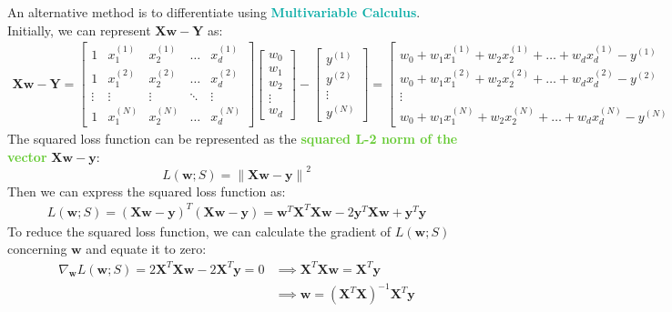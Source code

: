 \documentclass[twoside]{article}
\newcommand{\highlightbluetext}[1]{\textcolor[HTML]{09ACA6}{\textbf{#1}}}
\newcommand{\highlightgreentext}[1]{\textcolor[HTML]{62C92F}{\textbf{#1}}}
\numberwithin{equation}{section}
\begin{document}
	\newpage
	An alternative method is to differentiate using \highlightbluetext{Multivariable Calculus}. Initially, we can represent $\mathbf{Xw} - \mathbf{Y}$ as:
	\begin{align*}
		\mathbf{Xw} - \mathbf{Y} = \begin{bmatrix}
			1 & x_1^{(1)} & x_2^{(1)} & \ldots & x_d^{(1)} \\
			1 & x_1^{(2)} & x_2^{(2)} & \ldots & x_d^{(2)} \\
			\vdots & \vdots & \vdots & \ddots & \vdots \\
			1 & x_1^{(N)} & x_2^{(N)} & \ldots & x_d^{(N)} 
		\end{bmatrix} \begin{bmatrix} w_0 \\ w_1 \\ w_2 \\ \vdots \\ w_d \end{bmatrix} - \begin{bmatrix}
			y^{(1)} \\ y^{(2)} \\ \vdots \\ y^{(N)}
		\end{bmatrix} = \begin{bmatrix}
			w_0 + w_1 x_1^{(1)} + w_2 x_2^{(1)} + \ldots + w_d x_d^{(1)} - y^{(1)} \\
			w_0 + w_1 x_1^{(2)} + w_2 x_2^{(2)} + \ldots + w_d x_d^{(2)} - y^{(2)} \\
			\vdots \\
			w_0 + w_1 x_1^{(N)} + w_2 x_2^{(N)} + \ldots + w_d x_d^{(N)} - y^{(N)}
		\end{bmatrix}
	\end{align*}
	The squared loss function can be represented as the \highlightgreentext{squared L-2 norm of the vector} $\mathbf{Xw} - \mathbf{y}$:
	\begin{equation}
	\label{eq:MultiOutputRegressionSquaredLossFunction}
	\boxed{L(\mathbf{w}; S) = \left\| \mathbf{Xw} - \mathbf{y} \right\|^2}
	\end{equation}
	Then we can express the squared loss function as:
	\begin{align*}
		L(\mathbf{w}; S) = \left( \mathbf{Xw} - \mathbf{y} \right)^T \left( \mathbf{Xw} - \mathbf{y} \right) = \mathbf{w}^T \mathbf{X}^T \mathbf{X} \mathbf{w} - 2 \mathbf{y}^T \mathbf{X} \mathbf{w} + \mathbf{y}^T \mathbf{y}
	\end{align*}
	To reduce the squared loss function, we can calculate the gradient of $L(\mathbf{w}; S)$ concerning $\mathbf{w}$ and equate it to zero:
	\begin{align*}
		\nabla_{\mathbf{w}} L(\mathbf{w}; S) = 2 \mathbf{X}^T \mathbf{X} \mathbf{w} - 2 \mathbf{X}^T \mathbf{y} = 0
		&\implies \mathbf{X}^T \mathbf{X} \mathbf{w} = \mathbf{X}^T \mathbf{y} \\
		&\implies \mathbf{w} = \left( \mathbf{X}^T \mathbf{X} \right)^{-1} \mathbf{X}^T \mathbf{y}
	\end{align*}
\end{document}
